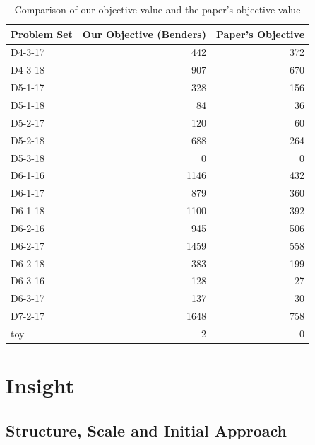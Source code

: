 \documentclass{article}
\begin{document}
\begin{table}[htb]
    \centering
    \begin{tabular}{|l|r|r|}
        \hline
        \textbf{Problem Set} & \textbf{Our Objective (Benders)} & \textbf{Paper's Objective} \\
        \hline
        D4-3-17 & 442 & 372 \\
        D4-3-18 & 907 & 670 \\
        D5-1-17 & 328 & 156 \\
        D5-1-18 & 84 & 36 \\
        D5-2-17 & 120 & 60 \\
        D5-2-18 & 688 & 264 \\
        D5-3-18 & 0 & 0 \\
        D6-1-16 & 1146 & 432 \\
        D6-1-17 & 879 & 360 \\
        D6-1-18 & 1100 & 392 \\
        D6-2-16 & 945 & 506 \\
        D6-2-17 & 1459 & 558 \\
        D6-2-18 & 383 & 199 \\
        D6-3-16 & 128 & 27 \\
        D6-3-17 & 137 & 30 \\
        D7-2-17 & 1648 & 758 \\
        toy & 2 & 0 \\
        \hline
    \end{tabular}
    \caption{Comparison of our objective value and the paper's objective value}
    \label{tab:comparison_@}
\end{table}

\newpage

\section{Insight}
\subsection{Structure, Scale and Initial Approach}\label{ref:structure_scale_approach}
\end{document}
